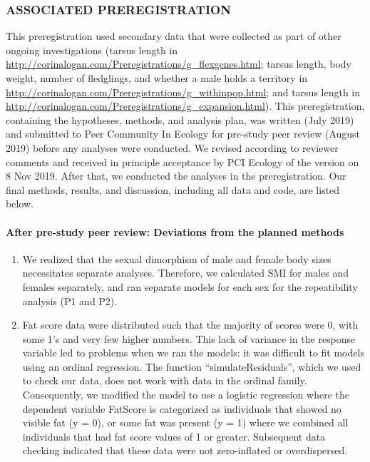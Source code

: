 \documentclass[
]{article}
\begin{document}
\hypertarget{associated-preregistration}{%
\subsubsection{ASSOCIATED
PREREGISTRATION}\label{associated-preregistration}}

This preregistration used secondary data that were collected as part of
other ongoing investigations (tarsus length in
\url{http://corinalogan.com/Preregistrations/g_flexgenes.html}; tarsus
length, body weight, number of fledglings, and whether a male holds a
territory in
\url{http://corinalogan.com/Preregistrations/g_withinpop.html}; and
tarsus length in
\url{http://corinalogan.com/Preregistrations/g_expansion.html}). This
preregistration, containing the hypotheses, methods, and analysis plan,
was written (July 2019) and submitted to Peer Community In Ecology for
pre-study peer review (August 2019) before any analyses were conducted.
We revised according to reviewer comments and received in principle
acceptance by PCI Ecology of the version on 8 Nov 2019. After that, we
conducted the analyses in the preregistration. Our final methods,
results, and discussion, including all data and code, are listed below.

\hypertarget{after-pre-study-peer-review-deviations-from-the-planned-methods}{%
\paragraph{\texorpdfstring{\textbf{After pre-study peer review:
Deviations from the planned
methods}}{After pre-study peer review: Deviations from the planned methods}}\label{after-pre-study-peer-review-deviations-from-the-planned-methods}}

\begin{enumerate}
\def\labelenumi{\arabic{enumi})}
\item
  We realized that the sexual dimorphism of male and female body sizes
  necessitates separate analyses. Therefore, we calculated SMI for males
  and females separately, and ran separate models for each sex for the
  repeatibility analysis (P1 and P2).
\item
  Fat score data were distributed such that the majority of scores were
  0, with some 1's and very few higher numbers. This lack of variance in
  the response variable led to problems when we ran the models: it was
  difficult to fit models using an ordinal regression. The function
  ``simulateResiduals'', which we used to check our data, does not work
  with data in the ordinal family. Consequently, we modified the model
  to use a logistic regression where the dependent variable FatScore is
  categorized as individuals that showed no visible fat (y = 0), or some
  fat was present (y = 1) where we combined all individuals that had fat
  score values of 1 or greater. Subsequent data checking indicated that
  these data were not zero-inflated or overdispersed.
\end{enumerate}
\end{document}
